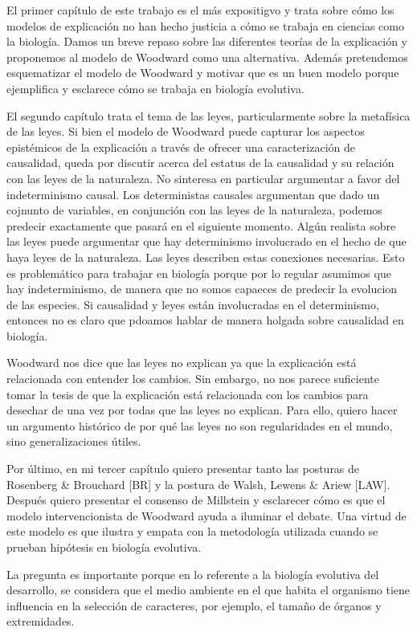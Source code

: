 El primer capítulo de este trabajo es el más expositigvo y trata sobre cómo los modelos de explicación no han hecho justicia a cómo se trabaja en ciencias como la biología. Damos un breve repaso sobre las diferentes teorías de la explicación y proponemos al modelo de Woodward como una alternativa. Además pretendemos esquematizar el modelo de Woodward y motivar que es un buen modelo porque ejemplifica y esclarece cómo se trabaja en biología evolutiva.

El segundo capítulo trata el tema de las leyes, particularmente sobre la metafísica de las leyes. Si bien el modelo de Woodward puede capturar los aspectos epistémicos de la explicación a través de ofrecer una caracterización de causalidad, queda por discutir acerca del estatus de la causalidad y su relación con las leyes de la naturaleza. No sinteresa en particular argumentar a favor del indeterminismo causal. Los deterministas causales argumentan que dado un cojnunto de variables, en conjunción con las leyes de la naturaleza, podemos predecir exactamente que pasará en el siguiente momento. Algún realista sobre las leyes puede argumentar que hay determinismo involucrado en el hecho de que haya leyes de la naturaleza. Las leyes describen estas conexiones necesarias. Esto es problemático para trabajar en biología porque por lo regular asumimos que hay indeterminismo, de manera que no somos capaeces de predecir la evolucion de las especies. Si causalidad y leyes están involucradas en el determinismo, entonces no es claro que pdoamos hablar de manera holgada sobre causalidad en biología.

Woodward nos dice que las leyes no explican ya que la explicación está relacionada con entender los cambios. Sin embargo, no nos parece suficiente tomar la tesis de que la explicación está relacionada con los cambios para desechar de una vez por todas que las leyes no explican. Para ello, quiero hacer un argumento histórico de por qué las leyes no son regularidades en el mundo, sino generalizaciones útiles.

Por último, en mi tercer capítulo quiero presentar tanto las posturas de Rosenberg \& Brouchard [BR] y la postura de Walsh, Lewens \& Ariew [LAW]. Después quiero presentar el consenso de Millstein y esclarecer cómo es que el modelo intervencionista de Woodward ayuda a iluminar el debate. Una virtud de este modelo  es que ilustra y empata con la metodología utilizada cuando se prueban hipótesis en biología evolutiva.

La pregunta es importante porque en lo referente a la biología evolutiva del desarrollo, se considera que el medio ambiente en el que habita el organismo tiene influencia en la selección de caracteres, por ejemplo, el tamaño de órganos y extremidades.

